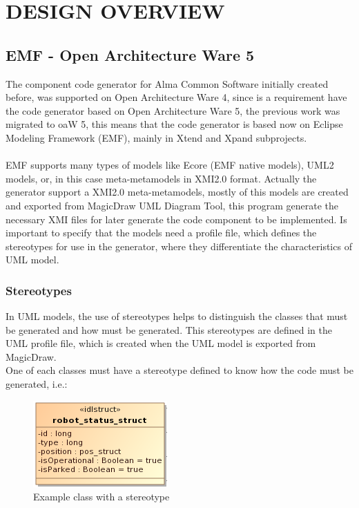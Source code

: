 \section{DESIGN OVERVIEW}
\subsection{EMF - Open Architecture Ware 5}
The component code generator for Alma Common Software initially created before,
was supported on Open Architecture Ware 4, since is a requirement have the
code generator based on Open Architecture Ware 5, the previous work was
migrated to oaW 5, this means that the code generator is based now on Eclipse
Modeling Framework (EMF), mainly in Xtend and Xpand subprojects.\\
\\
EMF supports many types of models like Ecore (EMF native models), UML2 models,
or, in this case meta-metamodels in XMI2.0 format. Actually the generator
support a XMI2.0 meta-metamodels, mostly of this models are created and exported
from MagicDraw UML Diagram Tool, this program generate the necessary XMI files
for later generate the code component to be implemented. 
Is important to specify that the models need a profile file, which defines the
stereotypes for use in the generator, where they differentiate the
characteristics of UML model.

\subsubsection{Stereotypes}
In UML models, the use of stereotypes helps to distinguish the classes that
must be generated and how must be generated. This stereotypes are defined in
the UML profile file, which is created when the UML model is exported from
MagicDraw.\\
One of each classes must have a stereotype defined to know how the code must be
generated, i.e.: 

\begin{figure}[h!t]
\begin{center}
\includegraphics[scale=0.3]{images/idlstruct}
\caption{\label{fig:ex_diag}Example class with a stereotype}
\end{center}
\end{figure}

